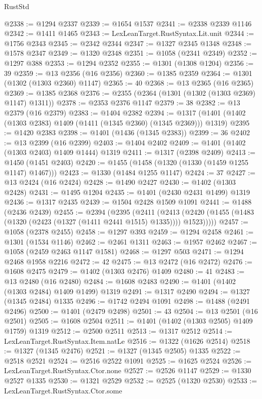 \begin{lexlean}{RustStd}
\begin{coremodule}
@2338 := @1294 @2337
@2339 := @1654 @1537
@2341 := @2338 @2339 @1146
@2342 := @1411 @1465
@2343 := LexLeanTarget.RustSyntax.Lit.unit
@2344 := @1756 @2343
@2345 := @2342 @2344
@2347 := @1327 @2345 @1348
@2348 := @1578 @2347
@2349 := @1320 @2348
@2351 := @1058 (@2341 @2349)
@2352 := @1297 @388
@2353 := @1294 @2352
@2355 := @1301 (@1308 @1204)
@2356 := 39
@2359 := @13 @2356 (@16 @2356)
@2360 := @1385 @2359
@2364 := @1301 (@1302 (@1303 @2360) @1147)
@2365 := 40
@2368 := @13 @2365 (@16 @2365)
@2369 := @1385 @2368
@2376 := @2355 (@2364 (@1301 (@1302 (@1303 @2369) @1147) @1311))
@2378 := @2353 @2376 @1147
@2379 := 38
@2382 := @13 @2379 (@16 @2379)
@2383 := @1404 @2382
@2394 := @1317 (@1401 (@1402 (@1303 @2383) @1409 (@1411 (@1345 @2360) (@1345 @2369))) @1319)
@2395 := @1420 @2383
@2398 := @1401 (@1436 (@1345 @2383))
@2399 := 36
@2402 := @13 @2399 (@16 @2399)
@2403 := @1404 @2402
@2409 := @1401 (@1402 (@1303 @2403) @1409 @1444) @1319
@2411 := @1317 (@2398 @2409)
@2413 := @1450 (@1451 @2403)
@2420 := @1455 (@1458 (@1320 (@1330 (@1459 @1255 @1147) @1467)))
@2423 := @1330 (@1484 @1255 @1147)
@2424 := 37
@2427 := @13 @2424 (@16 @2424)
@2428 := @1490 @2427
@2430 := @1402 (@1303 @2428)
@2431 := @1495 @1204
@2435 := @1401 (@2430 @2431 @1499) @1319
@2436 := @1317 @2435
@2439 := @1504 @2428 @1509 @1091
@2441 := @1488 (@2436 @2439)
@2455 := @2394
    (@2395
      (@2411
        (@2413 (@2420 (@1455 (@1483 (@1320 (@2423 (@1327 (@1411 @2441 @1515) @1335)))) @1523)))))
@2457 := @1058 (@2378 @2455)
@2458 := @1297 @393
@2459 := @1294 @2458
@2461 := @1301 (@1534 @1146)
@2462 := @2461 @1311
@2463 := @1957 @2462
@2467 := @1058 (@2459 @2463 @1147 @1581)
@2468 := @1297 @503
@2471 := @1294 @2468 @1958 @2216
@2472 := 42
@2475 := @13 @2472 (@16 @2472)
@2476 := @1608 @2475
@2479 := @1402 (@1303 @2476) @1409
@2480 := 41
@2483 := @13 @2480 (@16 @2480)
@2484 := @1608 @2483
@2490 := @1401 (@1402 (@1303 @2484) @1409 @1499) @1319
@2491 := @1317 @2490
@2494 := @1327 (@1345 @2484) @1335
@2496 := @1742 @2494 @1091
@2498 := @1488 (@2491 @2496)
@2500 := @1401 (@2479 @2498)
@2501 := 43
@2504 := @13 @2501 (@16 @2501)
@2505 := @1608 @2504
@2511 := @1401 (@1402 (@1303 @2505) @1409 @1759) @1319
@2512 := @2500 @2511
@2513 := @1317 @2512
@2514 := LexLeanTarget.RustSyntax.Item.natLe
@2516 := @1322 (@1626 @2514)
@2518 := @1327 (@1345 @2476)
@2521 := @1327 (@1345 @2505) @1335
@2522 := @2518 @2521
@2524 := @2516 @2522 @1091
@2525 := @1625 @2524
@2526 := LexLeanTarget.RustSyntax.Ctor.none
@2527 := @2526 @1147
@2529 := @1330 @2527 @1335
@2530 := @1321 @2529
@2532 := @2525 (@1320 @2530)
@2533 := LexLeanTarget.RustSyntax.Ctor.some

\end{coremodule}
\end{lexlean}
